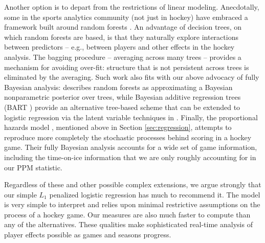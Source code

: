 Another option is to depart from the restrictions of linear modeling.  Anecdotally, some in the
sports analytics community (not just in hockey) have embraced a framework
built around random forests
\cite{breiman:2001}.  An advantage of decision trees, on which random forests
are based, is that they naturally explore interactions between predictors --
e.g., between players and other effects in the hockey analysis.  The bagging
procedure -- averaging across many trees -- provides a mechanism for avoiding
over-fit: structure that is not persistent across trees is eliminated by the
averaging. Such work also fits with our above advocacy of fully Bayesian
analysis:
 \cite{taddy:eta:2015} describes random forests as approximating a Bayesian
 nonparametric posterior over trees, while  Bayesian additive regression trees
 (BART
\cite{ChipGeorMcCu2010}) provide an alternative tree-based scheme that can be
extended to logistic regression via the  latent variable techniques in
\cite{gra:pols:2012}.   Finally, the proportional hazards model
\cite{ThoVenJen12}, mentioned above in Section \ref{sec:regression},  attempts to reproduce more completely the stochastic
processes behind scoring in a hockey game. Their fully Bayesian analysis
accounts for a wide set of game information, including the time-on-ice
information that we are only roughly accounting for in our PPM statistic.

Regardless of these and other possible complex extensions, we argue strongly
that our simple $L_1$ penalized logistic regression has much to recommend it.
The model is very simple to interpret and relies upon minimal restrictive
assumptions on the process of a hockey game.    Our measures are also much
faster to compute than any of the alternatives. These qualities make
sophisticated real-time analysis of player effects possible as games and
seasons progress.


